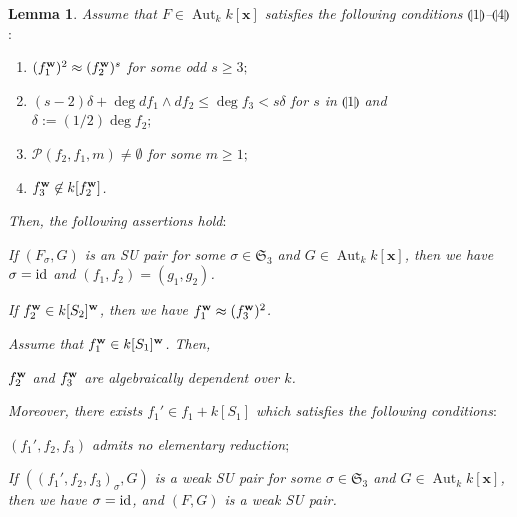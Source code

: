 \documentclass{amsart}
\theoremstyle{plain}
\newtheorem{llem}{Lemma}
\theoremstyle{definition}
\newcommand{\Aut }{\mathop{\mathrm{Aut}}\nolimits}
\newcommand{\id}{{\rm id}}
\newcommand{\nd}{\noindent}
\newcommand{\x}{{\boldsymbol x}}
\newcommand{\w}{{\bf w}}
\newcommand{\kx}{k[\x]}
\newcommand{\sym}{\mathfrak{S}}
\begin{document}
\begin{llem}\label{prop:structure2}
Assume that $F\in \Aut _k\kx $ satisfies 
the following conditions 
$\llparenthesis	1 \rrparenthesis$--$\llparenthesis 4 \rrparenthesis$$:$ 

\begin{enumerate}[leftmargin=10mm]

\item [$\llparenthesis	1 \rrparenthesis$] 
$(f_1^{\w })^2\approx (f_2^{\w })^s$ for some odd $s\geq 3;$ 


\item [$\llparenthesis	2 \rrparenthesis$] 
$(s-2)\delta +\deg df_1\wedge df_2\leq \deg f_3<s\delta $ 
for $s$ in $\llparenthesis 1 \rrparenthesis$ 
and $\delta :=(1/2)\deg f_2;$ 



\item [$\llparenthesis	3 \rrparenthesis$] 
$\mathcal{P}(f_2,f_1,m)\ne\emptyset $ 
for some $m\ge 1;$ 



\item [$\llparenthesis	4 \rrparenthesis$] 
$f_3^{\w }\not\in k[f_2^{\w }]$. 

\end{enumerate}


\nd 
Then, the following assertions hold$:$ 


\nd{\rm (i)} If $(F_{\sigma },G)$ is an SU pair 
for some $\sigma \in \sym _3$ and $G\in \Aut _k\kx $, 
then we have $\sigma =\id $ and $(f_1,f_2)=(g_1,g_2)$. 



\nd{\rm (ii)} 
If $f_2^{\w }\in k[S_2]^{\w }$, 
then we have $f_1^{\w }\approx (f_3^{\w })^2$. 


\nd{\rm (iii)} 
Assume that $f_1^{\w }\in k[S_1]^{\w }$. 
Then, 

\nd {\rm (1$^\star $)} 
$f_2^{\w }$ and $f_3^{\w }$ are algebraically dependent over $k$. 


\nd 
Moreover, 
there exists $f_1'\in f_1+k[S_1]$ 
which satisfies the following conditions$:$ 


\nd {\rm (2$^\star $)} 
$(f_1',f_2,f_3)$ admits no elementary reduction$;$ 

\nd {\rm (3$^\star $)} 
If $((f_1',f_2,f_3)_\sigma ,G)$ 
is a weak SU pair 
for some $\sigma \in \sym _3$ and $G\in \Aut _k\kx $, 
then we have $\sigma =\id $, 
and $(F,G)$ is a weak SU pair. 

\end{llem}
\end{document}
